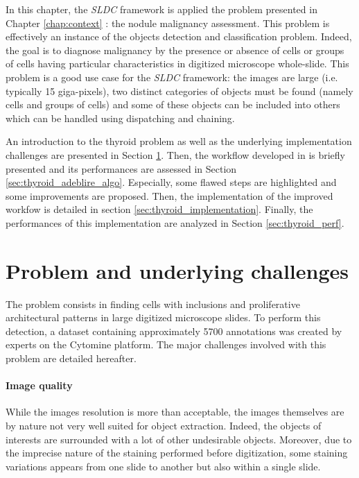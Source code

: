 In this chapter, the \textit{SLDC} framework is applied the problem presented in Chapter \ref{chap:context} : the nodule malignancy assessment. This problem is effectively an instance of the objects detection and classification problem. Indeed, the goal is to diagnose malignancy by the presence or absence of cells or groups of cells having particular characteristics in digitized microscope whole-slide. This problem is a good use case for the \textit{SLDC} framework: the images are large (i.e. typically 15 giga-pixels), two distinct categories of objects must be found (namely cells and groups of cells) and some of these objects can be included into others which can be handled using dispatching and chaining.  

An introduction to the thyroid problem as well as the underlying implementation challenges are presented in Section \ref{sec:thyroid_impl_issue}. Then, the workflow developed in \cite{adeblire2013} is briefly presented and its performances are assessed in Section \ref{sec:thyroid_adeblire_algo}. Especially, some flawed steps are highlighted and some improvements are proposed. Then, the implementation of the improved workfow is detailed in section \ref{sec:thyroid_implementation}. Finally, the performances of this implementation are analyzed in Section \ref{sec:thyroid_perf}.

\section{Problem and underlying challenges}
\label{sec:thyroid_impl_issue}
The problem consists in finding cells with inclusions and proliferative architectural patterns in large digitized microscope slides. To perform this detection, a dataset containing approximately 5700 annotations was created by experts on the Cytomine platform. The major challenges involved with this problem are detailed hereafter. 

\paragraph{Image quality} While the images resolution is more than acceptable, the images themselves are by nature not very well suited for object extraction. Indeed, the objects of interests are surrounded with a lot of other undesirable objects. Moreover, due to the imprecise nature of the staining performed before digitization, some staining variations appears from one slide to another but also within a single slide. 

